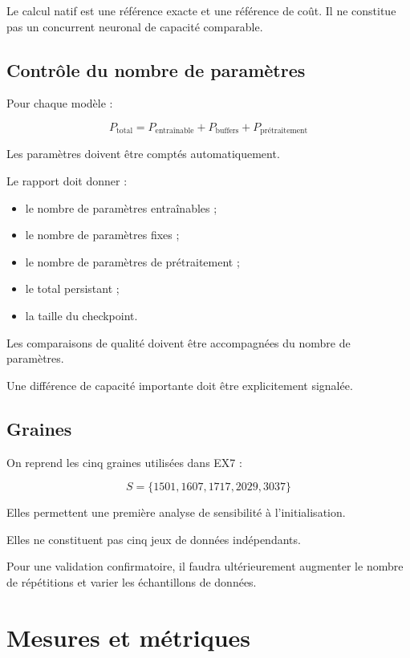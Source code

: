 \documentclass[11pt,a4paper]{article}
\begin{document}
Le calcul natif est une référence exacte et une référence
de coût. Il ne constitue pas un concurrent neuronal
de capacité comparable.

\subsection{Contrôle du nombre de paramètres}

Pour chaque modèle :

\[
P_{\mathrm{total}}
=
P_{\mathrm{entraînable}}
+
P_{\mathrm{buffers}}
+
P_{\mathrm{prétraitement}}
\]

Les paramètres doivent être comptés automatiquement.

Le rapport doit donner :
\begin{itemize}
    \item le nombre de paramètres entraînables ;
    \item le nombre de paramètres fixes ;
    \item le nombre de paramètres de prétraitement ;
    \item le total persistant ;
    \item la taille du checkpoint.
\end{itemize}

Les comparaisons de qualité doivent être accompagnées
du nombre de paramètres.

Une différence de capacité importante doit être
explicitement signalée.

\subsection{Graines}

On reprend les cinq graines utilisées dans EX7 :

\[
S=\{1501,1607,1717,2029,3037\}
\]

Elles permettent une première analyse de sensibilité
à l'initialisation.

Elles ne constituent pas cinq jeux de données indépendants.

Pour une validation confirmatoire, il faudra ultérieurement
augmenter le nombre de répétitions et varier les
échantillons de données.

\section{Mesures et métriques}
\end{document}
